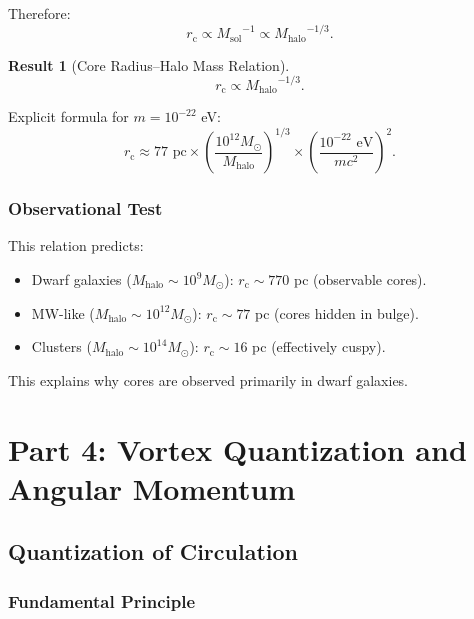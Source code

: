 \documentclass[11pt,a4paper]{article}
\newcommand{\Msun}{\ensuremath{M_{\odot}}}
\newcommand{\Msol}{\ensuremath{M_{\mathrm{sol}}}}
\newcommand{\Mhalo}{\ensuremath{M_{\mathrm{halo}}}}
\newcommand{\rc}{\ensuremath{r_{\mathrm{c}}}}
\theoremstyle{definition}
\newtheorem{result}{Result}
\theoremstyle{remark}
\begin{document}
Therefore:
\begin{equation}
\rc \propto \Msol^{-1} \propto \Mhalo^{-1/3}.
\end{equation}

\begin{result}[Core Radius--Halo Mass Relation]
\begin{equation}
\boxed{\rc \propto \Mhalo^{-1/3}.}
\end{equation}

Explicit formula for $m = 10^{-22}$ eV:
\begin{equation}
\rc \approx 77 \text{ pc} \times \left(\frac{10^{12}\Msun}{\Mhalo}\right)^{1/3} \times \left(\frac{10^{-22}\text{ eV}}{mc^2}\right)^2.
\end{equation}
\end{result}

\subsubsection{Observational Test}

This relation predicts:
\begin{itemize}
    \item Dwarf galaxies ($\Mhalo \sim 10^9 \Msun$): $\rc \sim 770$ pc (observable cores).
    \item MW-like ($\Mhalo \sim 10^{12} \Msun$): $\rc \sim 77$ pc (cores hidden in bulge).
    \item Clusters ($\Mhalo \sim 10^{14} \Msun$): $\rc \sim 16$ pc (effectively cuspy).
\end{itemize}

This explains why cores are observed primarily in dwarf galaxies.

\section{Part 4: Vortex Quantization and Angular Momentum}
\label{sec:vortices}

\subsection{Quantization of Circulation}
\label{sec:circulation}

\subsubsection{Fundamental Principle}
\end{document}
